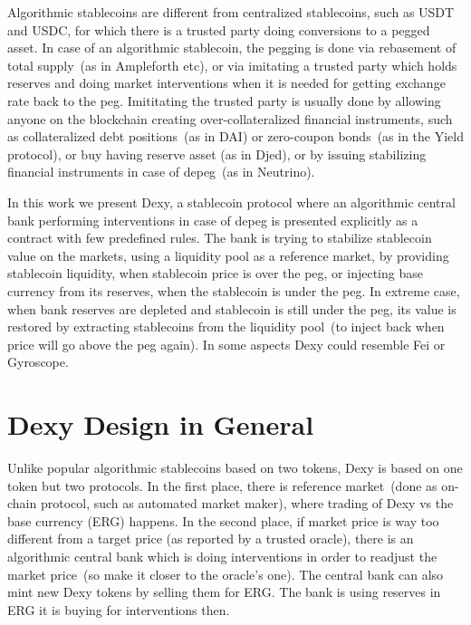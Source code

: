 \documentclass{article}   %
\newcommand{\authnote}[2]{\marginpar{\parbox{\marginparwidth}{\tiny %
  \textsf{#1 {\textcolor{blue}{notes: #2}}}}}%
  \textcolor{blue}{\textbf{\dag}}}
\newcommand{\authnote}[2]{
  \textsf{#1 \textcolor{blue}{: #2}}}
\newcommand{\authnote}[2]{}
\newcommand{\knote}[1]{{\authnote{\textcolor{green}{Alex notes}}{#1}}}
\newcommand{\bc}{ERG}
\newcommand{\dx}{Dexy}
\begin{document}
Algorithmic stablecoins are different from centralized stablecoins, such as USDT and USDC, for which there is a trusted party doing conversions to a pegged asset. In case of an algorithmic stablecoin, the 
pegging is done via rebasement of total supply~(as in Ampleforth etc), or via imitating a trusted party which holds reserves and doing market interventions when it is needed for getting exchange rate back to the peg. Imititating the trusted party is usually done by allowing anyone on the blockchain creating over-collateralized financial instruments, such as collateralized debt positions~(as 
in DAI) or zero-coupon bonds~(as in the Yield protocol), or buy having reserve asset (as in Djed), or by issuing stabilizing financial instruments in case of depeg~(as in Neutrino). \knote{add links to the paragraph above}

In this work we present \dx{}, a stablecoin protocol where an algorithmic central bank performing interventions in case of depeg is presented explicitly as a contract with few predefined rules. The bank is trying to stabilize stablecoin value on the markets, using a liquidity pool as a reference market, by providing stablecoin liquidity, when stablecoin price is over the peg, or injecting base currency from its reserves, when the stablecoin is under the peg. In extreme case, when bank reserves are depleted and stablecoin is still under the peg, its value is restored by extracting stablecoins from the liquidity pool~(to inject back when price will go above the peg again). In some aspects \dx{} could resemble Fei or Gyroscope. \knote{make comparison subsection}  


\section{\dx{} Design in General}

Unlike popular algorithmic stablecoins based on two tokens, \dx{} is based on one token but two protocols. In the first place, 
there is reference market~(done as on-chain protocol, such as automated market maker), where trading of \dx{} vs the base currency (\bc{}) happens. In the second place, if market price is way too different from a target price (as reported by a trusted oracle), there is an algorithmic central bank which is doing interventions in order to readjust the market price~(so make it closer to the oracle's one). The central bank can also mint new \dx{} tokens by selling them for \bc{}. The bank is using reserves in \bc{} it is buying for interventions then. 
\end{document}

